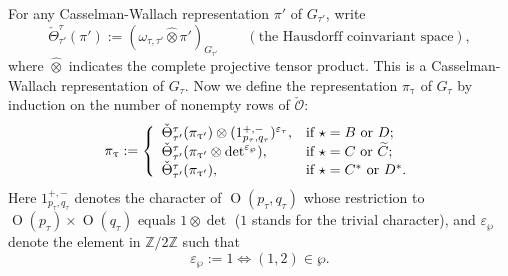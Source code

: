 \documentclass[12pt,a4paper]{amsart}
\def\abs#1{\left|{#1}\right|}
\newcommand{\CO}{{\mathcal {O}}}
\newcommand{\oO}{\operatorname{O}}
\newcommand{\Z}{\mathbb{Z}}
\numberwithin{equation}{section}
\theoremstyle{remark}
\begin{document}
 For any Casselman-Wallach representation $\pi'$ of $G_{\tau'}$, write
 \[
   \check \Theta_{\tau'}^{\tau}(\pi'):=(\omega_{\tau, \tau'}\widehat \otimes \pi')_{G_{\tau'}} \qquad (\textrm{the Hausdorff coinvariant space}),
 \]
 where $\widehat \otimes$ indicates the complete projective tensor product. This is a Casselman-Wallach representation of $G_\tau$.
 Now we define the representation $\pi_{\uptau}$ of $G_\tau$ by induction on the number of nonempty rows of $\check \CO$:
 \begin{equation}\label{eq:def-pi}
    \pi_{\uptau}:=\left\{
     \begin{array}{ll}
         \check \Theta_{\tau'}^{\tau}(\pi_{\uptau'})\otimes (1_{p_\tau, q_\tau}^{+,-})^{\varepsilon_{\tau}}, &\hbox{if  $\star=B$ or $D$}; \\
         \check \Theta_{\tau'}^{\tau}(\pi_{\uptau'}\otimes \det^{\varepsilon_{\wp}}), &\hbox{if $\star=C$ or $\widetilde C$}; \\
              \check \Theta_{\tau'}^{\tau}(\pi_{\uptau'}), &\hbox{if $\star=C^*$ or $D^*$}. \\
            \end{array}
   \right.
 \end{equation}
 Here $1_{p_\tau, q_\tau}^{+,-}$ denotes the character of $\oO(p_\tau, q_\tau)$ whose restriction to $\oO(p_\tau)\times \oO(q_\tau)$ equals $1\otimes \det$ ($1$ stands for the trivial character), and
$\varepsilon_{\wp}$ denote the element in $\Z/2\Z$ such that  \[
 \varepsilon_{\wp}:=1\Leftrightarrow  (1,2)\in \wp.
\]
\end{document}
